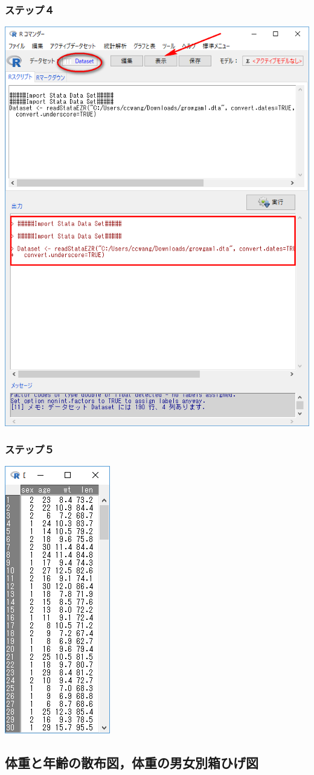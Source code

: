 \documentclass[]{problemset}
\begin{document}
\hypertarget{-3}{%
\subsubsection{ステップ４}\label{-3}}

\begin{center}\includegraphics[width=0.5\linewidth]{pic/import04} \end{center}

\hypertarget{-4}{%
\subsubsection{ステップ５}\label{-4}}

\begin{center}\includegraphics[width=0.2\linewidth]{pic/import05} \end{center}

\subsection{体重と年齢の散布図，体重の男女別箱ひげ図}
\end{document}
